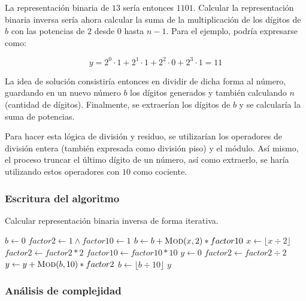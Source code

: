 \documentclass[letter]{article}
\begin{document}
La representación binaria de $13$ sería entonces $1101$. Calcular la representación binaria inversa sería ahora calcular la suma de la multiplicación de los dígitos de $b$ con las potencias de $2$ desde $0$ hasta $n-1$. Para el ejemplo, podría expresarse como: \par

\[ y = 2^{0} \cdot 1 + 2^{1} \cdot 1 + 2^{2} \cdot 0  + 2^{3} \cdot 1 = 11 \]

La idea de solución consistiría entonces en dividir de dicha forma al número, guardando en un nuevo número $b$ los dígitos generados y también calculando $n$ (cantidad de dígitos). Finalmente, se extraerían los dígitos de $b$ y se calcularía la suma de potencias. \par

Para hacer esta lógica de división y residuo, se utilizarían los operadores de división entera (también expresada como división piso) y el módulo. Así mismo, el proceso truncar el último dígito de un número, así como extraerlo, se haría utilizando estos operadores con $10$ como cociente. \par

\subsubsection{Escritura del algoritmo} \label{algoritmos:iterativo:algoritmo}

\begin{algorithm}[!ht]
\caption{Calcular representación binaria inversa de forma iterativa.}
\begin{algorithmic}[1] 
    \State $b \leftarrow 0$
    \State $factor2 \leftarrow 1 \land factor10 \leftarrow 1$
        \State $b \leftarrow b + \Call{Mod}{x, 2} * factor10$
        \State $x \leftarrow \lfloor x \div 2 \rfloor$
        \State $factor2 \leftarrow factor2 * 2$
        \State $factor10 \leftarrow factor10 * 10$
    \EndWhile
    \State $y \leftarrow 0$
        \State $factor2 \leftarrow factor2 \div 2$
        \State $y \leftarrow y + \Call{Mod}{b, 10} * factor2$
        \State $b \leftarrow \lfloor b \div 10 \rfloor$
    \EndWhile
    \State \Return $y$
\EndProcedure
\end{algorithmic}
\end{algorithm}

\subsubsection{Análisis de complejidad} \label{algoritmos:iterativo:complejidad}
\end{document}
